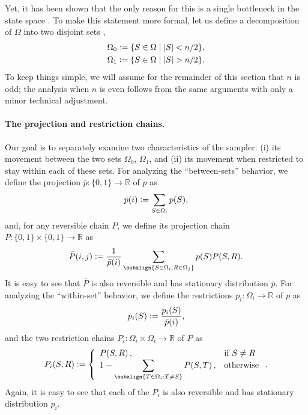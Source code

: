 Yet, it has been shown that the only reason for this is a single bottleneck in the state space \citep{levin08}.
To make this statement more formal, let us define a decomposition of $\Omega$ into two disjoint sets \citep{jerrum04poincare},
\begin{align*}
\Omega_0 &\vcentcolon= \{S \in \Omega \mid |S| < n/2\},\\
\Omega_1 &\vcentcolon= \{S \in \Omega \mid |S| > n/2\}.
\end{align*}
To keep things simple, we will assume for the remainder of this section that $n$ is odd; the analysis when $n$ is even follows from the same arguments with only a minor technical adjustment.

\paragraph{The projection and restriction chains.}
Our goal is to separately examine two characteristics of the sampler: (i) its movement between the two sets $\Omega_0$, $\Omega_1$, and (ii) its movement when restricted to stay within each of these sets.
For analyzing the ``between-sets'' behavior, we define the projection $\bar{p} : \{0, 1\} \to \mathbb{R}$ of $p$ as
\begin{align*}
  \bar{p}(i) \vcentcolon= \sum_{S \in \Omega_i} p(S),
\end{align*}
and, for any reversible chain $P$, we define its projection chain $\bar{P} : \{0, 1\} \times \{0, 1\} \to \mathbb{R}$ as
\begin{align*}
  \bar{P}(i, j) \defeq \frac{1}{\bar{p}(i)} \sum_{\subalign{S \in \Omega_i, R \in \Omega_j}} p(S) P(S, R).
\end{align*}
It is easy to see that $\bar{P}$ is also reversible and has stationary distribution $\bar{p}$. For analyzing the ``within-set'' behavior, we define the restrictions $p_i : \Omega_i \to \mathbb{R}$ of $p$ as
\begin{align*}
  p_i(S) \vcentcolon= \frac{p_i(S)}{\bar{p}(i)},
\end{align*}
and the two restriction chains $P_i : \Omega_i \times \Omega_i \to \mathbb{R}$ of $P$ as
\begin{align*}
  P_i(S, R) \defeq \twopartdefo{P(S, R)}{S \neq R}{1 - \displaystyle\sum_{\subalign{T \in \Omega_i: T \neq S}}P(S, T)}.
\end{align*}
Again, it is easy to see that each of the $P_i$ is also reversible and has stationary distribution $p_i$.

